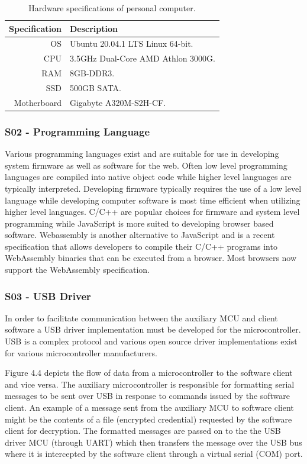 \begin{table}[]
\centering

\begin{tabular}{|r|l|}
\hline
\multicolumn{1}{|l|}{\textbf{Specification}} & \textbf{Description} \\ \hline
OS & Ubuntu 20.04.1 LTS Linux 64-bit. \\ \hline
CPU & 3.5GHz Dual-Core AMD Athlon 3000G.\\ \hline
RAM & 8GB-DDR3. \\ \hline
SSD & 500GB SATA.\\ \hline
Motherboard & Gigabyte A320M-S2H-CF. \\ \hline
\end{tabular}
\caption{Hardware specifications of personal computer.}
\label{tbl:HWSWRequirements}
\end{table}

\subsubsection{S02 - Programming Language}
Various programming languages exist and are suitable for use in developing system firmware as well as software for the web. Often low level programming languages are compiled into native object code while higher level languages are typically interpreted. Developing firmware typically requires the use of a low level language while developing computer software is most time efficient when utilizing higher level languages. C/C++ are popular choices for firmware and system level programming while JavaScript is more suited to developing browser based software. Webassembly is another alternative to JavaScript and is a recent specification that allows developers to compile their C/C++ programs into WebAssembly binaries that can be executed from a browser. Most browsers now support the WebAssembly specification.

\subsubsection{S03 - USB Driver}

In order to facilitate communication between the auxiliary MCU and client software a USB driver implementation must be developed for the microcontroller. USB is a complex protocol and various open source driver implementations exist for various microcontroller manufacturers.

Figure 4.4 depicts the flow of data from a microcontroller to the software client and vice versa. The auxiliary microcontroller is responsible for formatting serial messages to be sent over USB in response to commands issued by the software client. An example of a message sent from the auxiliary MCU to software client might be the contents of a file (encrypted credential) requested by the software client for decryption. The formatted messages are passed on to the the USB driver MCU (through UART) which then transfers the message over the USB bus where it is intercepted by the software client through a virtual serial (COM) port.

